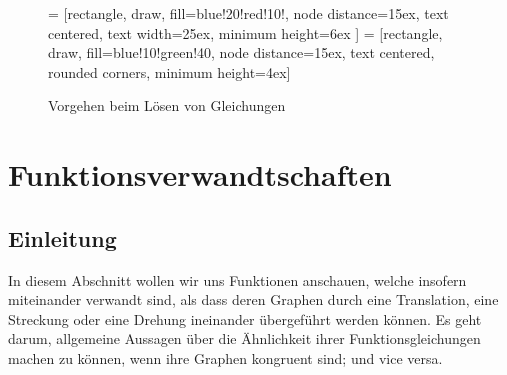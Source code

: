 \documentclass[%
11pt,%
twoside,%
titlepage,%
german,%
headsepline%
]{scrartcl}
\newcommand{\faEyeLightGray}{\textcolor{lightgray}{\faEye}} %
\newcommand{\concatueb}[1]{ueb:#1}%
\newcommand{\concatlsg}[1]{lsg:#1}%
\newcounter{uebcounter}[section]
\renewcommand{\theuebcounter}{\thesection.\arabic{uebcounter}}  %
\newcommand{\uebh}[2]{%
 \refstepcounter{uebcounter} %
 \par\noindent\textbf{Übung \theuebcounter:}\label{\concatueb{#1}} %
    #2
    \hfill\hyperref[\concatlsg{#1}]{\faEyeLightGray}
    \vspace{\parskip}
}
\begin{document}
\begin{landscape}
\begin{figure}
\begin{center}

 = [rectangle, draw, fill=blue!20!red!10!, node distance=15ex, text centered, %
text width=25ex, minimum height=6ex
]
 = [rectangle, draw, fill=blue!10!green!40, node distance=15ex, text centered, rounded corners, minimum height=4ex]

\end{center}
\caption{Vorgehen beim Lösen von Gleichungen}
\end{figure}
\end{landscape}

\section{Funktionsverwandtschaften}

\subsection{Einleitung}
  In diesem Abschnitt wollen wir uns Funktionen anschauen, welche insofern miteinander verwandt sind, als dass deren Graphen durch eine Translation, eine Streckung oder eine Drehung ineinander übergeführt werden können. Es geht darum, allgemeine Aussagen über die Ähnlichkeit ihrer Funktionsgleichungen machen zu können, wenn ihre Graphen kongruent sind; und vice versa.
\end{document}

